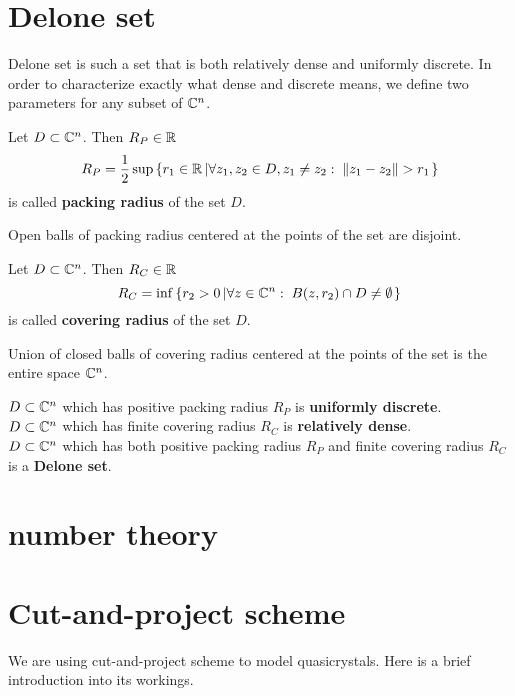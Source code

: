 \documentclass[text.tex]{subfiles}
\begin{document}
\section{Delone set}
Delone set is such a set that is both relatively dense and uniformly discrete. In order to characterize exactly what dense and discrete means, we define two parameters for any subset of $\mathbb{C}^n$. 

\begin{definition}\label{def_deloneSetPacking}
Let $D\subset \mathbb{C}^n$. Then $R_P\in\mathbb{R}$
$$R_P = \frac{1}{2}\sup\left\{ r_1\in \mathbb{R}\left| \forall z_1,z_2\in D, z_1\neq z_2:\; \lVert z_1-z_2\rVert >r_1 \right. \right\}$$
is called \textbf{packing radius} of the set $D$. 
\end{definition}

\begin{remark}
Open balls of packing radius centered at the points of the set are disjoint. 
\end{remark}

\begin{definition}\label{def_deloneSetCovering}
Let $D\subset \mathbb{C}^n$. Then $R_C\in\mathbb{R}$
$$R_C = \inf\left\{ r_2>0\left| \forall z\in\mathbb{C}^n:\; B(z,r_2)\cap D \neq \emptyset \right. \right\}$$
is called \textbf{covering radius} of the set $D$. 
\end{definition}

\begin{remark}
Union of closed balls of covering radius centered at the points of the set is the entire space $\mathbb{C}^n$. 
\end{remark}

\begin{definition}\label{def_deloneSet}
$D\subset \mathbb{C}^n$ which has positive packing radius $R_P$ is \textbf{uniformly discrete}.\\
$D\subset \mathbb{C}^n$ which has finite covering radius $R_C$ is \textbf{relatively dense}.\\
$D\subset \mathbb{C}^n$ which has both positive packing radius $R_P$ and finite covering radius $R_C$ is a \textbf{Delone set}.
\end{definition}

\section{number theory}

\section{Cut-and-project scheme}\label{sec_cutAndProject}
We are using cut-and-project scheme to model quasicrystals. Here is a brief introduction into its workings. 
\end{document}
